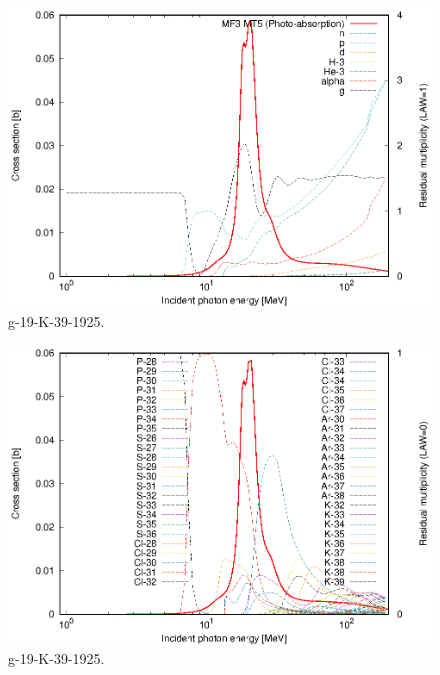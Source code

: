 \begin{figure}
 \includegraphics[width=\linewidth]{eps/g_19-K-39_1925.eps}
  \caption{g-19-K-39-1925.}
\end{figure}
\begin{figure}
 \includegraphics[width=\linewidth]{eps-law0/g_19-K-39_1925.eps}
 \caption{g-19-K-39-1925.}
\end{figure}
\newpage \clearpage

